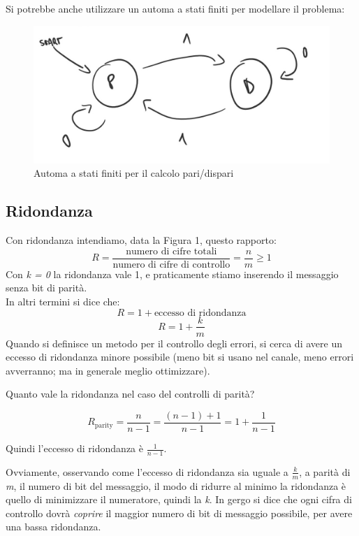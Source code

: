 Si potrebbe anche utilizzare un automa a stati finiti per modellare il problema:

\begin{figure}[h]
	\centering
	\includegraphics[width=0.6\linewidth]{immagini/img3}
	\caption{Automa a stati finiti per il calcolo pari/dispari}
\end{figure}

\subsection*{Ridondanza}

Con ridondanza intendiamo, data la Figura 1, questo rapporto:
\begin{equation}
R = \frac{\text{numero di cifre totali}}{\text{numero di cifre di controllo}} = \frac{n}{m} \geq 1
\end{equation}
Con \textit{k = 0} la ridondanza vale 1, e praticamente stiamo inserendo il messaggio senza bit di parità.\\
In altri termini si dice che:
\begin{equation}
R = 1 + \text{eccesso di ridondanza}
\end{equation}
\begin{equation*}
R = 1 + \frac{k}{m}
\end{equation*}
Quando si definisce un metodo per il controllo degli errori, si cerca di avere un eccesso di ridondanza minore possibile (meno bit si usano nel canale, meno errori avverranno; ma in generale meglio ottimizzare).

Quanto vale la ridondanza nel caso del controlli di parità?

\begin{equation}
R_{\text{parity}} = \frac{n}{n-1} = \frac{(n-1)+1}{n-1} = 1 + \frac{1}{n-1}
\end{equation}

Quindi l'eccesso di ridondanza è $\frac{1}{n-1}$.

Ovviamente, osservando come l'eccesso di ridondanza sia uguale a $\frac{k}{m}$, a parità di \textit{m}, il numero di bit del messaggio, il modo di ridurre al minimo la ridondanza è quello di minimizzare il numeratore, quindi la \textit{k}.
In gergo si dice che ogni cifra di controllo dovrà \textit{coprire} il maggior numero di bit di messaggio possibile, per avere una bassa ridondanza.


